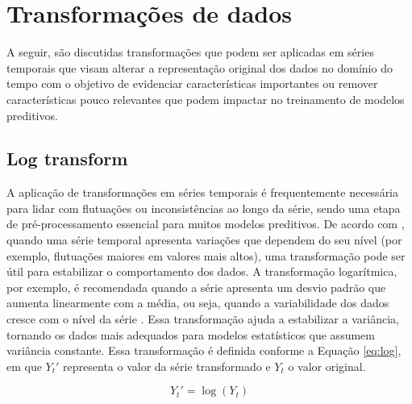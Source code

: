



\section{Transformações de dados}
A seguir, são discutidas transformações que podem ser aplicadas em  séries temporais que visam alterar a representação original dos dados no domínio do tempo com o objetivo de evidenciar características importantes ou remover características pouco relevantes que podem impactar no treinamento de modelos preditivos.

\subsection{Log transform}

A aplicação de transformações em séries temporais é frequentemente necessária para lidar com flutuações ou inconsistências ao longo da série, sendo uma etapa de pré-processamento essencial para muitos modelos preditivos. De acordo com \citet{hyndman2014}, quando uma série temporal apresenta variações que dependem do seu nível (por exemplo, flutuações maiores em valores mais altos), uma transformação pode ser útil para estabilizar o comportamento dos dados. A transformação logarítmica, por exemplo, é recomendada quando a série apresenta um desvio padrão que aumenta linearmente com a média, ou seja, quando a variabilidade dos dados cresce com o nível da série \citep{brockwell2016}. Essa transformação ajuda a estabilizar a variância, tornando os dados mais adequados para modelos estatísticos que assumem variância constante. Essa transformação é definida conforme a Equação \eqref{eq:log}, em que $Y_{t}'$ representa o valor da série transformado e $Y_{t}$ o valor original.

\begin{equation}
    Y_{t}' = \log({Y_t})
    \label{eq:log}
\end{equation}

